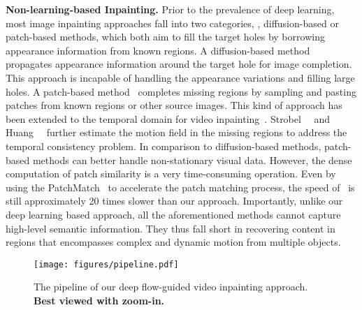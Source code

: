 \documentclass[10pt,twocolumn,letterpaper]{article}
\begin{document}
\noindent
\textbf{Non-learning-based Inpainting.}
Prior to the prevalence of deep learning, most image inpainting approaches fall into two categories, \ie, diffusion-based or patch-based methods, which both aim to fill the target holes by borrowing appearance information from known regions.
A diffusion-based method~\cite{ballester2001filling, bertalmio2000image, levin2003learning} propagates appearance information around the target hole for image completion.
This approach is incapable of handling the appearance variations and filling large holes.
A patch-based method~\cite{ bertalmio2003simultaneous, darabi2012image, efros2001image, simakov2008summarizing} completes missing regions by sampling and pasting patches from known regions or other source images.
This kind of approach has been extended to the temporal domain for video inpainting~\cite{newson2013towards, newson2014video, shih2009exemplar}. 
Strobel~\etal~\cite{strobel2014flow} and Huang~\etal~\cite{Huang-SigAsia-2016} further estimate the motion field in the missing regions to address the temporal consistency problem.
In comparison to diffusion-based methods, patch-based methods can better handle non-stationary visual data. However, the dense computation of patch similarity is a very time-consuming operation.
Even by using the PatchMatch~\cite{barnes2009patchmatch, barnes2010generalized} to accelerate the patch matching process, the speed of~\cite{Huang-SigAsia-2016} is still approximately 20 times slower than our approach.
Importantly, unlike our deep learning based approach, all the aforementioned methods cannot capture high-level semantic information. They thus fall short in recovering content in regions that encompasses complex and dynamic motion from multiple objects.   

\begin{figure*}[t]
	\centering
	\texttt{[image: figures/pipeline.pdf]}
	\vspace{-10pt}
	\caption{\small{The pipeline of our deep flow-guided video inpainting approach. \textbf{Best viewed with zoom-in.}}}
	\label{fig:pipeline}
	\vspace{-10pt}
\end{figure*}
\end{document}
